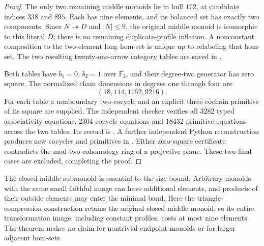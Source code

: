 \begin{proof}
The only two remaining middle monoids lie in hull $172$, at
candidate indices $338$ and $895$.  Each has nine elements, and
its balanced set has exactly two components.  Since
$N\twoheadrightarrow D$ and $|N|\le9$, the original middle
monoid is isomorphic to this literal $D$; there is no remaining
duplicate-profile inflation.  A nonconstant composition to the
two-element long hom-set is unique up to relabeling that hom-set.
The two resulting twenty-one-arrow category tables are saved in
.

Both tables have $b_1=0$, $b_2=1$ over $\mathbb F_2$, and their
degree-two generator has zero square.  The normalized chain
dimensions in degrees one through four are
\[
 (18,144,1152,9216).
\]
For each table a nonboundary two-cocycle and an explicit
three-cochain primitive of its square are supplied.  The
independent checker verifies all $3282$ typed associativity
equations, $2304$ cocycle equations and $18432$ primitive
equations across the two tables.  Its record is
.
A further independent Python reconstruction produces new
cocycles and primitives in
.
Either zero-square certificate contradicts the mod-two cohomology
ring of a projective plane.  These two final cases are excluded,
completing the proof.
\end{proof}

\begin{remark}\label{C:closed-middle-two-long-scope}
The closed middle submonoid is essential to the size bound.
Arbitrary monoids with the same small faithful image can have
additional elements, and products of their outside elements may
enter the minimal band.  Here the triangle-compression construction
retains the original closed middle monoid, so its entire
transformation image, including constant profiles, costs at most
nine elements.  The theorem makes no claim for nontrivial endpoint
monoids or for larger adjacent hom-sets.
\end{remark}

